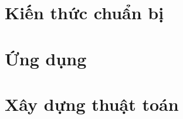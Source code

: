 \documentclass[a4paper,oneside,12pt]{report}
\begin{document}

\thispagestyle{empty}
\cleardoublepage
{}



\cleardoublepage
{}

\chapter{Kiến thức chuẩn bị}





\chapter{Ứng dụng}


\chapter{Xây dựng thuật toán}
\end{document}
